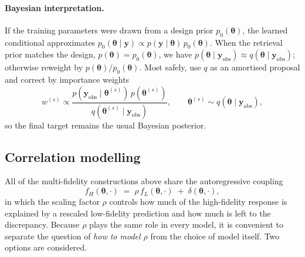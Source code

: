 \documentclass[11pt,a4paper]{article}
\newcommand{\yv}{\bm{y}}
\newcommand{\bth}{\bm{\theta}}
\newcommand{\by}{\bm{y}}
\begin{document}
\paragraph{Bayesian interpretation.}
If the training parameters were drawn from a design prior \(p_0(\bth)\), the
learned conditional approximates \(p_0(\bth\mid\by)\propto p(\by\mid\bth)\,p_0(\bth)\).
When the retrieval prior matches the design, \(p(\bth)=p_0(\bth)\), we have
\(p(\bth\mid\yv_{\mathrm{obs}})\approx q(\bth\mid\yv_{\mathrm{obs}})\); otherwise
reweight by \(p(\bth)/p_0(\bth)\). Most safely, use \(q\) as an amortised
proposal and correct by importance weights
\[
    w^{(s)}\propto
    \frac{p(\yv_{\mathrm{obs}}\mid\bth^{(s)})\,p(\bth^{(s)})}
         {q(\bth^{(s)}\mid\yv_{\mathrm{obs}})},
    \qquad
    \bth^{(s)}\sim q(\bth\mid\yv_{\mathrm{obs}}),
\]
so the final target remains the usual Bayesian posterior.





\subsection{Correlation modelling}
\label{subsec:correlation-modelling}

All of the multi-fidelity constructions above share the autoregressive
coupling
\[
    f_H(\boldsymbol\theta,\cdot)
    \;=\;
    \rho\,f_L(\boldsymbol\theta,\cdot)
    \;+\;
    \delta(\boldsymbol\theta,\cdot),
\]
in which the scaling factor $\rho$ controls how much of the high-fidelity
response is explained by a rescaled low-fidelity prediction and how much is
left to the discrepancy. Because $\rho$ plays the same role in every model,
it is convenient to separate the question of \emph{how to model $\rho$} from
the choice of model itself. Two options are considered.
\end{document}
